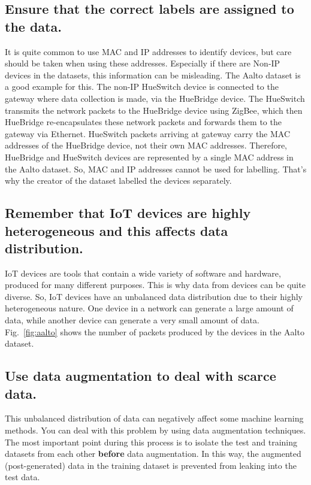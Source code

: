 \documentclass[journal]{IEEEtran}
\begin{document}
\subsection{Ensure that the correct labels are assigned to the data.}

It is quite common to use MAC and IP addresses to identify  devices, but care should be taken when using these addresses. Especially if there are Non-IP devices in the datasets, this information can be misleading. The Aalto dataset is a good example for this.  The non-IP HueSwitch device is connected to the gateway where data collection is made, via the HueBridge device. The HueSwitch transmits the network packets to the HueBridge device using ZigBee, which then HueBridge re-encapsulates these network packets and forwards them to the gateway via Ethernet. HueSwitch packets arriving at gateway carry the MAC addresses of the HueBridge device, not their own MAC addresses. Therefore, HueBridge and HueSwitch devices are represented by a single MAC address in the Aalto dataset. So, MAC and IP addresses cannot be used for labelling.  That's why the creator of the dataset labelled the devices separately.

\subsection{Remember that IoT devices are highly heterogeneous and this affects data distribution.}
IoT devices are tools that contain a wide variety of software and hardware, produced for many different purposes. This is why data from devices can be quite diverse. So, IoT devices have an unbalanced data distribution due to their highly heterogeneous nature. One device in a network can generate a large amount of data, while another device can generate a very small amount of data. Fig.~\ref{fig:aalto} shows the number of packets produced by the devices in the Aalto dataset. 

\subsection{Use data augmentation  to deal with scarce data.}
This unbalanced distribution of data can negatively affect some machine learning methods. You can deal with this problem by using data augmentation techniques. The most important point during this process is to isolate the test and training datasets from each other \textbf{before} data augmentation. In this way, the augmented (post-generated) data in the training dataset is prevented from leaking into the test data.
\end{document}
